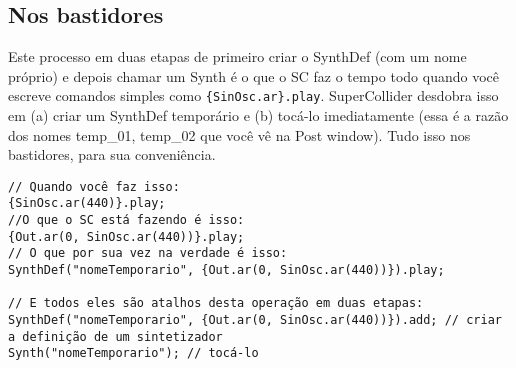 \subsection{Nos bastidores}

Este processo em duas etapas de primeiro criar o SynthDef (com um nome próprio) e depois chamar um Synth é o que o SC faz o tempo todo quando você escreve comandos simples como \texttt{\{SinOsc.ar\}.play}. SuperCollider desdobra isso em (a) criar um SynthDef temporário e (b) tocá-lo imediatamente (essa é a razão dos nomes temp\_01, temp\_02 que você vê na Post window). Tudo isso nos bastidores, para sua conveniência.
 
\begin{lstlisting}[style=SuperCollider-IDE, basicstyle=\scttfamily\footnotesize]
// Quando você faz isso:
{SinOsc.ar(440)}.play;
//O que o SC está fazendo é isso:
{Out.ar(0, SinOsc.ar(440))}.play;
// O que por sua vez na verdade é isso:
SynthDef("nomeTemporario", {Out.ar(0, SinOsc.ar(440))}).play;

// E todos eles são atalhos desta operação em duas etapas:
SynthDef("nomeTemporario", {Out.ar(0, SinOsc.ar(440))}).add; // criar a definição de um sintetizador
Synth("nomeTemporario"); // tocá-lo
\end{lstlisting}
